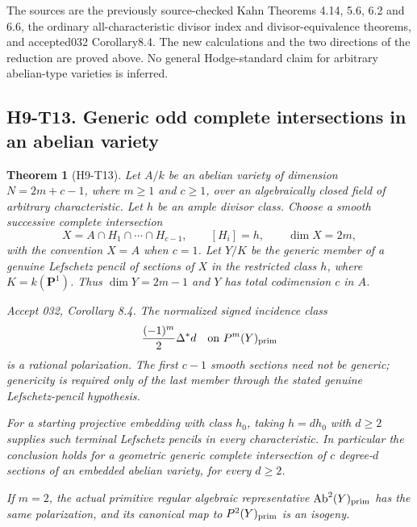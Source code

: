 \documentclass[11pt,a4paper]{article}
\newtheorem{theorem}{Theorem}[section]
\begin{document}
The sources are the previously source-checked Kahn Theorems 4.14,
5.6, 6.2 and 6.6, the ordinary all-characteristic divisor index
and divisor-equivalence theorems, and accepted032 Corollary8.4.
The new calculations and the two directions of the reduction are
proved above. No general Hodge-standard claim for arbitrary
abelian-type varieties is inferred.



\subsection*{H9-T13. Generic odd complete intersections in an abelian variety}

\begin{theorem}[H9-T13]
Let $A/k$ be an abelian variety of dimension
$N=2m+c-1$, where $m\ge1$ and $c\ge1$, over an algebraically closed
field of arbitrary characteristic. Let $h$ be an ample divisor class.
Choose a smooth successive complete intersection
\[
 X=A\cap H_1\cap\cdots\cap H_{c-1},\qquad [H_i]=h,
 \qquad \dim X=2m,
\]
with the convention $X=A$ when $c=1$. Let $Y/K$ be the generic member
of a genuine Lefschetz pencil of sections of $X$ in the restricted
class $h$, where $K=k(\mathbf P^1)$. Thus
$\dim Y=2m-1$ and $Y$ has total codimension $c$ in $A$.

Accept 032, Corollary 8.4. The normalized signed incidence class
\[
 \frac{(-1)^m}{2}\Delta^*d
       \quad\text{on }P^m(Y)_{\rm prim}
\]
is a rational polarization. The first $c-1$ smooth sections need not
be generic; genericity is required only of the last member through
the stated genuine Lefschetz-pencil hypothesis.

For a starting projective embedding with class $h_0$, taking
$h=d h_0$ with $d\ge2$ supplies such terminal Lefschetz pencils in
every characteristic. In particular the conclusion holds for a
geometric generic complete intersection of $c$ degree-$d$ sections
of an embedded abelian variety, for every $d\ge2$.

If $m=2$, the actual primitive regular algebraic representative
$\operatorname{Ab}^2(Y)_{\rm prim}$ has the same polarization, and
its canonical map to $P^2(Y)_{\rm prim}$ is an isogeny.
\end{theorem}
\end{document}
